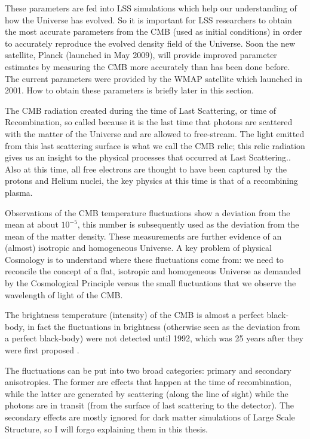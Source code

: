 These parameters are fed into LSS simulations which help our understanding of how the Universe has evolved. So it is important for LSS researchers to obtain the most accurate parameters from the CMB (used as initial conditions) in order to accurately reproduce the evolved density field of the Universe. Soon the new satellite, Planck (launched in May 2009), will provide improved parameter estimates by measuring the CMB more accurately than has been done before. The current parameters were provided by the WMAP satellite which launched in 2001. How to obtain these parameters is briefly later in this section.

The CMB radiation created during the time of Last Scattering, or time of Recombination, so called because it is the last time that photons are scattered with the matter of the Universe and are allowed to free-stream. The light emitted from this last scattering surface is what we call the CMB relic; this relic radiation gives us an insight to the physical processes that occurred at Last Scattering.. Also at this time, all free electrons are thought to have been captured by the protons and Helium nuclei, the key physics at this time is that of a recombining plasma. \citep{bib_pea, bib_lah, bib_baum}

Observations of the CMB temperature fluctuations show a deviation from the mean at about $10^{-5}$, this number is subsequently used as the deviation from the mean of the matter density. These measurements are further evidence of an (almost) isotropic and homogeneous Universe. A key problem of physical Cosmology is to understand where these fluctuations come from: we need to reconcile the concept of a flat, isotropic and homogeneous Universe as demanded by the Cosmological Principle versus the small fluctuations that we observe the wavelength of light of the CMB.

The brightness temperature (intensity) of the CMB is almost a perfect black-body, in fact the fluctuations in brightness (otherwise seen as the deviation from a perfect black-body) were not detected until 1992, which was 25 years after they were first proposed \citep{bib_pea}.

The fluctuations can be put into two broad categories: primary and secondary anisotropies. The former are effects that happen at the time of recombination, while the latter are generated by scattering (along the line of sight) while the photons are in transit (from the surface of last scattering to the detector). The secondary effects are mostly ignored for dark matter simulations of Large Scale Structure, so I will forgo explaining them in this thesis.

